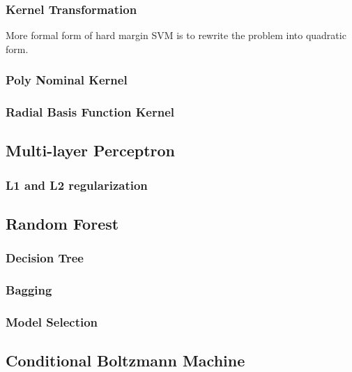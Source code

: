\subsubsection*{Kernel Transformation}
More formal form of hard margin SVM is to rewrite the problem into quadratic form. 
\subsubsection*{Poly Nominal Kernel}

\subsubsection*{Radial Basis Function Kernel}



\subsection{Multi-layer Perceptron}

\subsubsection*{L1 and L2 regularization}

\subsection{Random Forest}

\subsubsection{Decision Tree}

\subsubsection*{Bagging}

\subsubsection*{Model Selection}

\subsection{Conditional Boltzmann Machine}

